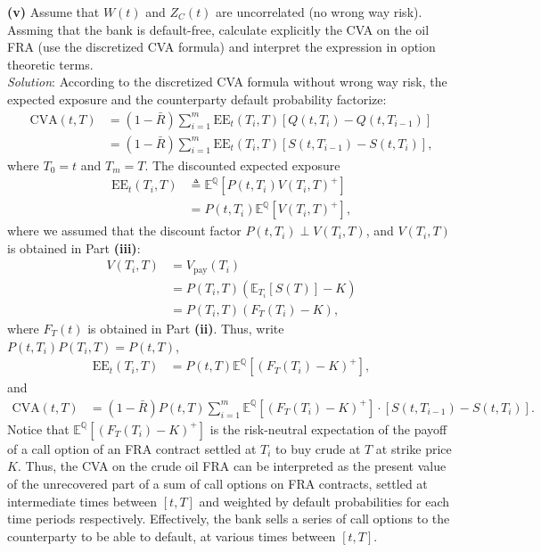 \documentclass[paper=a4, fontsize=11pt]{scrartcl} %
\numberwithin{equation}{section} %
\numberwithin{figure}{section} %
\numberwithin{table}{section} %
\begin{document}
\textbf{(v)} Assume that $W(t)$ and $Z_C(t)$ are uncorrelated (no wrong way risk). Assming that the bank is default-free, 
calculate explicitly the CVA on the oil FRA (use the discretized CVA formula) and interpret the expression in option
theoretic terms.\\
\textit{Solution}: According to the discretized CVA formula without wrong way risk, the
expected exposure and the counterparty default probability factorize:
\begin{align*}
\text{CVA}(t,T) &= (1-\bar{R})\sum_{i=1}^m \text{EE}_t(T_i,T)\left[ Q(t,T_i) - Q(t,T_{i-1}) \right]\\
&= (1-\bar{R})\sum_{i=1}^m \text{EE}_t(T_i,T)\left[  S(t,T_{i-1}) - S(t,T_i)\right],
\end{align*}
where $T_0 = t$ and $T_m = T$. The discounted expected exposure
\begin{align*}
\text{EE}_t(T_i,T) &\triangleq \mathbb{E}^{\mathbb{Q}}[P(t,T_i)V(T_i,T)^+]\\
 &= P(t,T_i)\mathbb{E}^{\mathbb{Q}}[V(T_i,T)^+],
\end{align*}
where we assumed that the discount factor $P(t,T_i) \perp V(T_i,T)$, and $V(T_i,T)$ is obtained in Part \textbf{(iii)}:
\begin{align*}
V(T_i,T) &= V_{\text{pay}}(T_i)\\
&=  P(T_i,T)\left(\mathbb{E}_{T_i}\left[ S(T) \right] - K\right)\\
&=  P(T_i,T)\left(F_T(T_i)- K\right),
\end{align*}
where $F_T(t)$ is obtained in Part \textbf{(ii)}. Thus, write $P(t,T_i)P(T_i,T)=P(t,T)$,
\begin{align*}
\text{EE}_t(T_i,T) &= P(t,T)\mathbb{E}^{\mathbb{Q}}[ \left(F_T(T_i)- K\right)^+],
\end{align*}
and
\begin{align*}
\text{CVA}(t,T) &=  (1-\bar{R})P(t,T)\sum_{i=1}^m  \mathbb{E}^{\mathbb{Q}}[ \left(F_T(T_i)- K\right)^+]\cdot\left[  S(t,T_{i-1}) - S(t,T_i)\right].
\end{align*}
Notice that $\mathbb{E}^{\mathbb{Q}}[ \left(F_T(T_i)- K\right)^+]$ is the risk-neutral expectation of the payoff of 
a call option of an FRA contract settled at $T_i$ to buy crude at $T$ at strike price $K$. Thus, the CVA on the crude oil FRA can be
interpreted as the present value of the unrecovered part of a sum of call options on FRA contracts, settled at intermediate times between $[t,T]$ 
and weighted by default probabilities for each time periods respectively. Effectively, the bank sells a series of call options to the
counterparty to be able to default, at various times between $[t,T]$.\\
\end{document}
